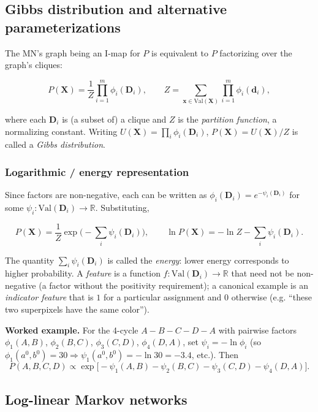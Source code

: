 \documentclass[11pt]{article}
\begin{document}
\subsection{Gibbs distribution and alternative parameterizations}

The MN's graph being an I-map for $P$ is equivalent to $P$ factorizing over
the graph's cliques:

\[
P(\mathbf{X}) = \frac{1}{Z} \prod_{i=1}^{m} \phi_i(\mathbf{D}_i), \qquad
Z = \sum_{\mathbf{x} \in \mathrm{Val}(\mathbf{X})} \prod_{i=1}^m \phi_i(\mathbf{d}_i),
\]

where each $\mathbf{D}_i$ is (a subset of) a clique and $Z$ is the
\emph{partition function}, a normalizing constant. Writing $U(\mathbf{X}) =
\prod_i \phi_i(\mathbf{D}_i)$, $P(\mathbf{X}) = U(\mathbf{X})/Z$ is called a
\emph{Gibbs distribution}.

\subsubsection{Logarithmic / energy representation}

Since factors are non-negative, each can be written as
$\phi_i(\mathbf{D}_i) = e^{-\psi_i(\mathbf{D}_i)}$ for some
$\psi_i : \mathrm{Val}(\mathbf{D}_i) \to \mathbb{R}$. Substituting,

\[
P(\mathbf{X}) = \frac{1}{Z} \exp\Big(-\sum_i \psi_i(\mathbf{D}_i)\Big), \qquad
\ln P(\mathbf{X}) = -\ln Z - \sum_i \psi_i(\mathbf{D}_i).
\]

The quantity $\sum_i \psi_i(\mathbf{D}_i)$ is called the \emph{energy}:
lower energy corresponds to higher probability. A \emph{feature} is a
function $f : \mathrm{Val}(\mathbf{D}_i) \to \mathbb{R}$ that need not be
non-negative (a factor without the positivity requirement); a canonical
example is an \emph{indicator feature} that is $1$ for a particular
assignment and $0$ otherwise (e.g. ``these two superpixels have the same
color'').

\textbf{Worked example.} For the 4-cycle $A - B - C - D - A$ with pairwise
factors $\phi_1(A,B)$, $\phi_2(B,C)$, $\phi_3(C,D)$, $\phi_4(D,A)$, set
$\psi_i = -\ln \phi_i$ (so $\phi_1(a^0,b^0)=30 \Rightarrow \psi_1(a^0,b^0) =
-\ln 30 = -3.4$, etc.). Then
\[
P(A,B,C,D) \propto \exp\big[-\psi_1(A,B) - \psi_2(B,C) - \psi_3(C,D) - \psi_4(D,A)\big].
\]

\subsection{Log-linear Markov networks}
\end{document}
